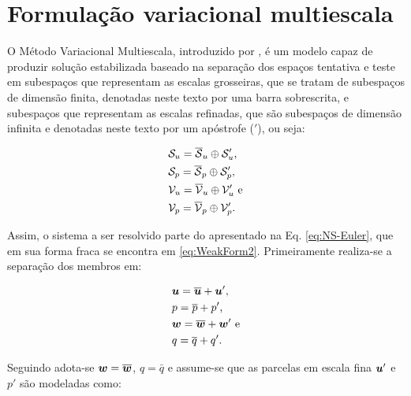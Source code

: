 \section{Formulação variacional multiescala} \label{VMS}

O Método Variacional Multiescala, introduzido por , é um modelo capaz de produzir solução estabilizada baseado na separação dos espaços tentativa e teste em subespaços que representam as escalas grosseiras, que se tratam de subespaços de dimensão finita, denotadas neste texto por uma barra sobrescrita, e subespaços que representam as escalas refinadas, que são subespaços de dimensão infinita e denotadas neste texto por um apóstrofe ($'$), ou seja:

\begin{subequations}
    \begin{align}
         & \mathcal{S}_u=\overline{\mathcal{S}}_u\oplus\mathcal{S}'_u\text{,}  \\
         & \mathcal{S}_p=\overline{\mathcal{S}}_p\oplus\mathcal{S}'_p\text{,}  \\
         & \mathcal{V}_u=\overline{\mathcal{V}}_u\oplus\mathcal{V}'_u\text{ e} \\
         & \mathcal{V}_p=\overline{\mathcal{V}}_p\oplus\mathcal{V}'_p\text{.}
    \end{align}
\end{subequations}

Assim, o sistema a ser resolvido parte do apresentado na Eq. \eqref{eq:NS-Euler}, que em sua forma fraca se encontra em \eqref{eq:WeakForm2}. Primeiramente realiza-se a separação dos membros em:

\begin{subequations}
    \begin{align}
         & \boldsymbol{u}=\overline{\boldsymbol{u}}+\boldsymbol{u}'\text{,}  \\
         & p=\overline{p}+p'\text{,}            \\
         & \boldsymbol{w}=\overline{\boldsymbol{w}}+\boldsymbol{w}'\text{ e} \\
         & q=\overline{q}+q'\text{.}
    \end{align}
\end{subequations}

Seguindo  adota-se $\boldsymbol{w}=\overline{\boldsymbol{w}}$, $q=\bar{q}$ e assume-se que as parcelas em escala fina $\boldsymbol{u}'$ e $p'$ são modeladas como:

